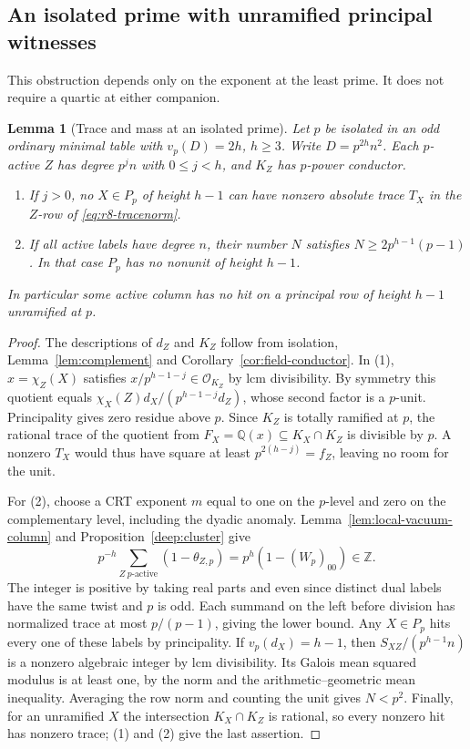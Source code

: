 \documentclass[11pt,a4paper]{article}
\numberwithin{equation}{section}
\newtheorem{lemma}[theorem]{Lemma}
\theoremstyle{remark}
\newcommand{\QQ}{\mathbb Q}
\begin{document}
\subsection{An isolated prime with unramified principal witnesses}\label{found:S:3}
\label{found:S:key:sec:oddunram}
This obstruction depends only on the exponent at the least prime. It
does not require a quartic at either companion.

\begin{lemma}[Trace and mass at an isolated prime]\label{found:S:3.1}\label{found:S:key:lem:unramisol}
Let $p$ be isolated in an odd ordinary minimal table with $v_p(D)=2h$,
$h\ge3$. Write $D=p^{2h}n^2$. Each $p$-active $Z$ has degree $p^jn$
with $0\le j<h$, and $K_Z$ has $p$-power conductor.
\begin{enumerate}
\item If $j>0$, no $X\in P_p$ of height $h-1$ can have nonzero
absolute trace $T_X$ in the $Z$-row of \eqref{eq:r8-tracenorm}.
\item If all active labels have degree $n$, their number $N$ satisfies
$N\ge2p^{h-1}(p-1)$. In that case $P_p$ has no nonunit of height $h-1$.
\end{enumerate}
In particular some active column has no hit on a principal row of
height $h-1$ unramified at $p$.
\end{lemma}
\begin{proof}
The descriptions of $d_Z$ and $K_Z$ follow from isolation,
Lemma~\ref{lem:complement} and Corollary~\ref{cor:field-conductor}.
In (1), $x=\chi_Z(X)$ satisfies $x/p^{h-1-j}\in\mathcal O_{K_Z}$
by lcm divisibility. By symmetry this quotient equals
$\chi_X(Z)d_X/(p^{h-1-j}d_Z)$, whose second factor is a $p$-unit.
Principality gives zero residue above $p$. Since $K_Z$ is totally
ramified at $p$, the rational trace of the quotient from
$F_X=\QQ(x)\subseteq K_X\cap K_Z$ is divisible by $p$. A nonzero $T_X$ would thus
have square at least $p^{2(h-j)}=f_Z$, leaving no room for the unit.

For (2), choose a CRT exponent $m$ equal to one on the $p$-level and
zero on the complementary level, including the dyadic anomaly.
Lemma~\ref{lem:local-vacuum-column} and Proposition~\ref{deep:cluster} give
\[
 p^{-h}\sum_{Z\ \text{$p$-active}}(1-\theta_{Z,p})
       =p^h(1-(W_p)_{00})\in\mathbb Z .
\]
The integer is positive by taking real parts and even since distinct dual
labels have the same twist and $p$ is odd. Each summand on the left before
division has normalized trace at most $p/(p-1)$, giving the lower
bound. Any $X\in P_p$ hits every one of these labels by principality.
If $v_p(d_X)=h-1$, then $S_{XZ}/(p^{h-1}n)$ is a nonzero algebraic
integer by lcm divisibility. Its Galois mean squared modulus is at least
one, by the norm and the arithmetic--geometric mean inequality.
Averaging the row norm and counting the unit gives $N<p^2$.
Finally, for an unramified $X$ the intersection $K_X\cap K_Z$ is rational,
so every nonzero hit has nonzero trace; (1) and (2) give the last assertion.
\end{proof}
\end{document}

